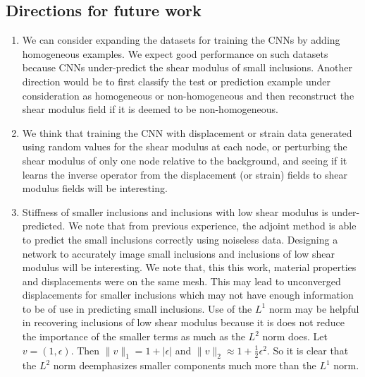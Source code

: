 \documentclass[12pt]{article}
\begin{document}
\subsection{Directions for future work}
\begin{enumerate}
\item{We can consider expanding the datasets for training the CNNs by adding homogeneous examples. We expect good performance on such datasets because CNNs under-predict the shear modulus of small inclusions. Another direction would be to first classify the test or prediction example under consideration as homogeneous or non-homogeneous and then reconstruct the shear modulus field if it is deemed to be non-homogeneous.}
\item{We think that training the CNN with displacement or strain data generated using random values for the shear modulus at each node, or perturbing the shear modulus of only one node relative to the background, and seeing if it learns the inverse operator from the displacement (or strain) fields to shear modulus fields will be interesting.}%
\item{Stiffness of smaller inclusions and inclusions with low shear modulus is under-predicted. We note that from previous experience, the adjoint method \cite{paper:oberai2003,paper:oberaipmb2004,paper:gokhale2008} is able to predict the small inclusions correctly using noiseless data. Designing a network to accurately image small inclusions and inclusions of low shear modulus will be interesting. We note that, this this work,  material properties and displacements were on the same mesh. This may lead to unconverged displacements for smaller inclusions which may not have enough information to be of use in predicting small inclusions. Use of the $L^1$ norm may be helpful in recovering inclusions of low shear modulus because it is does not reduce the importance of the smaller terms as much as the $L^2$ norm does. Let $v=(1,\epsilon)$. Then $\|v\|_1=1+|\epsilon|$ and $\|v\|_2\approx1+\frac{1}{2}\epsilon^2$. So it is clear that the $L^2$ norm deemphasizes smaller components much more than the $L^1$ norm.}

\end{enumerate}
\end{document}
